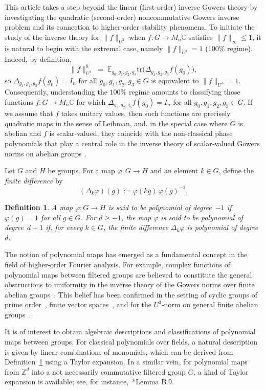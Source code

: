 \documentclass[a4paper,11pt]{amsproc}
\theoremstyle{plain}
\newtheorem{definition}[theorem]{Definition}
\theoremstyle{definition}
\begin{document}
This article takes a step beyond the linear (first‐order) inverse Gowers theory by investigating the quadratic (second‐order) noncommutative Gowers inverse problem and its connection to higher‐order stability phenomena.  To initiate the study of the inverse theory for $\|f\|_{U^3}$ when $f\colon G\to M_n \mathbb C$ satisfies $\|f\|_\infty\le1$, it is natural to begin with the extremal case, namely $\|f\|_{U^3}=1$ ($100 \%$ regime).  Indeed, by definition,
$$
\|f\|_{U^3}^{8} \;=\; \mathbb{E}_{g_0,g_1,g_2,g_3} \mathrm{tr}\bigl(\Delta_{g_1,g_2,g_3}f(g_0)\bigr),
$$
so $\Delta_{g_1,g_2,g_3}f(g_0)=I_n$ for all $g_0,g_1,g_2,g_3\in G$ is equivalent to $\|f\|_{U^3}=1$.  Consequently, understanding the $100 \%$ regime amounts to classifying those functions $f\colon G\to M_n \mathbb C$ for which $\Delta_{g_1,g_2,g_3}f(g_0)=I_n$ for all $g_0,g_1,g_2,g_3\in G$. If we assume that $f$ takes unitary values, then such functions are precisely quadratic maps in the sense of Leibman, and, in the special case where $G$ is abelian and $f$ is scalar‐valued, they coincide with the non-classical phase polynomials that play a central role in the inverse theory of scalar‐valued Gowers norms on abelian groups \cites{jst,tz1,tz2}. 

Let $G$ and $H$ be groups. For a map $\varphi \colon G \to H$ and an element $k \in G$, define the \emph{finite difference} by
\[
(\Delta_k \varphi)(g) := \varphi(kg)\, \varphi(g)^{-1}.
\]

\begin{definition}\label{def-poly}
A map $\varphi \colon G \to H$ is said to be \emph{polynomial of degree~$-1$} if $\varphi(g) = 1$ for all $g \in G$.  
For $d \geq -1$, the map $\varphi$ is said to be \emph{polynomial of degree~$d+1$} if, for every $k \in G$, the finite difference $\Delta_k \varphi$ is polynomial of degree $d$.
\end{definition}

The notion of polynomial maps has emerged as a fundamental concept in the field of higher-order Fourier analysis. For example, complex functions of polynomial maps between filtered groups are believed to constitute the general obstructions to uniformity in the inverse theory of the Gowers norms over finite abelian groups~\cite{jt}. This belief has been confirmed in the setting of cyclic groups of prime order~\cite{gtz}, finite vector spaces~\cites{tz1,tz2}, and for the $U^3$-norm on general finite abelian groups~\cite{jt}. 

It is of interest to obtain algebraic descriptions and classifications of polynomial maps between groups. For classical polynomials over fields, a natural description is given by linear combinations of monomials, which can be derived from Definition~\ref{def-poly} using a Taylor expansion. In a similar vein, for polynomial maps from $\mathbb{Z}^d$ into a not necessarily commutative filtered group $G$, a kind of Taylor expansion is available; see, for instance,~\cite{gtz}*{Lemma B.9}. 
\end{document}
